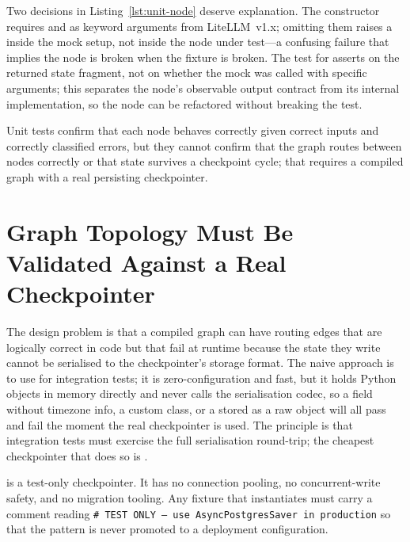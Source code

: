 Two decisions in Listing~\ref{lst:unit-node} deserve explanation.
The  constructor requires  and
 as keyword arguments from LiteLLM~v1.x; omitting
them raises a  inside the mock setup, not inside the
node under test---a confusing failure that implies the node is broken
when the fixture is broken.
The test for  asserts on the returned state fragment,
not on whether the mock was called with specific arguments; this
separates the node's observable output contract from its internal
implementation, so the node can be refactored without breaking the test.

Unit tests confirm that each node behaves correctly given correct inputs
and correctly classified errors, but they cannot confirm that the graph
routes between nodes correctly or that state survives a checkpoint cycle;
that requires a compiled graph with a real persisting checkpointer.

\section{Graph Topology Must Be Validated Against a Real Checkpointer}
\label{sec:integration-topology}

The design problem is that a compiled graph can have routing edges that
are logically correct in code but that fail at runtime because the state
they write cannot be serialised to the checkpointer's storage format.
The naive approach is to use  for integration tests;
it is zero-configuration and fast, but it holds Python objects in memory
directly and never calls the serialisation codec, so a 
field without timezone info, a custom class, or a 
stored as a raw object will all pass  and fail the
moment the real checkpointer is used.
The principle is that integration tests must exercise the full
serialisation round-trip; the cheapest checkpointer that does so is
.

\begin{warningbox}
 is a test-only checkpointer.
It has no connection pooling, no concurrent-write safety, and no
migration tooling.
Any fixture that instantiates  must carry a comment
reading \texttt{\# TEST ONLY --- use AsyncPostgresSaver in production}
so that the pattern is never promoted to a deployment configuration.
\end{warningbox}

